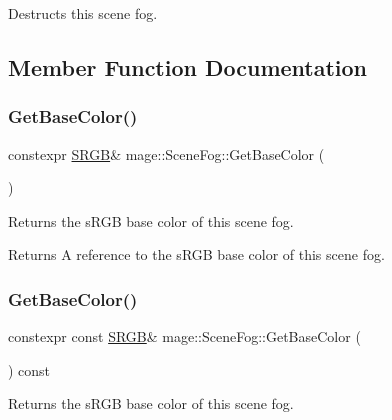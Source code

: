 Destructs this scene fog. 

\subsection{Member Function Documentation}
\hypertarget{classmage_1_1_scene_fog_ac60d69f3aff33717a0bf32cc49e5f00e}{}\label{classmage_1_1_scene_fog_ac60d69f3aff33717a0bf32cc49e5f00e} 
\subsubsection{\texorpdfstring{Get\+Base\+Color()}{GetBaseColor()}\hspace{0.1cm}{\footnotesize\ttfamily [1/2]}}
{\footnotesize\ttfamily constexpr \hyperlink{structmage_1_1_s_r_g_b}{S\+R\+GB}\& mage\+::\+Scene\+Fog\+::\+Get\+Base\+Color (\begin{DoxyParamCaption}{ }\end{DoxyParamCaption})\hspace{0.3cm}{\ttfamily [noexcept]}}

Returns the s\+R\+GB base color of this scene fog.

\begin{DoxyReturn}{Returns}
A reference to the s\+R\+GB base color of this scene fog. 
\end{DoxyReturn}
\hypertarget{classmage_1_1_scene_fog_a0180c6682f2ee226efa025403d36e102}{}\label{classmage_1_1_scene_fog_a0180c6682f2ee226efa025403d36e102} 
\subsubsection{\texorpdfstring{Get\+Base\+Color()}{GetBaseColor()}\hspace{0.1cm}{\footnotesize\ttfamily [2/2]}}
{\footnotesize\ttfamily constexpr const \hyperlink{structmage_1_1_s_r_g_b}{S\+R\+GB}\& mage\+::\+Scene\+Fog\+::\+Get\+Base\+Color (\begin{DoxyParamCaption}{ }\end{DoxyParamCaption}) const\hspace{0.3cm}{\ttfamily [noexcept]}}

Returns the s\+R\+GB base color of this scene fog.


